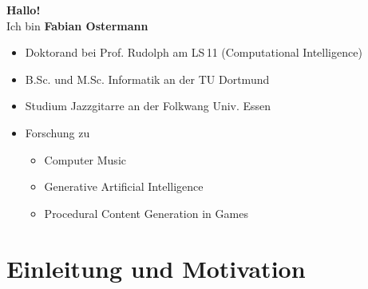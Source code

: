 
\begin{frame}
	\centering
	{\color{TUDoGreen} \huge\textbf{Hallo!}}\\
	\medskip
	\Large Ich bin \textbf{Fabian Ostermann}
	
	\bigskip
	\begin{itemize}
		\normalsize
		\item Doktorand bei Prof. Rudolph am LS\,11 (Computational Intelligence)\\
		\item B.Sc. und M.Sc. Informatik an der TU Dortmund\\
		\item Studium Jazzgitarre an der Folkwang Univ. Essen
		\item Forschung zu
		\begin{itemize}
			\item Computer Music
			\item Generative Artificial Intelligence
			\item Procedural Content Generation in Games
		\end{itemize}
	\end{itemize}
\end{frame}

\section{Einleitung und Motivation}

